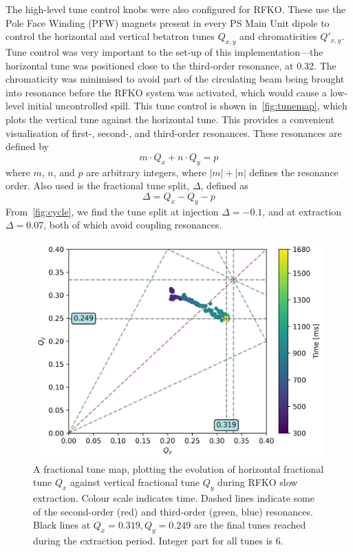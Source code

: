 \documentclass[a4paper,twoside,11pt]{report}
\begin{document}
The high-level tune control knobs were also configured for RFKO. These use the Pole Face Winding (PFW) magnets present in every PS Main Unit dipole to control the horizontal and vertical betatron tunes $Q_{x, y}$ and chromaticities $Q'_{x, y}$. Tune control was very important to the set-up of this implementation---the horizontal tune was positioned close to the third-order resonance, at 0.32. The chromaticity was minimised to avoid part of the circulating beam being brought into resonance before the RFKO system was activated, which would cause a low-level initial uncontrolled spill. This tune control is shown in~\autoref{fig:tunemap}, which plots the vertical tune against the horizontal tune. This provides a convenient visualisation of first-, second-, and third-order resonances. These resonances are defined by
\begin{equation}
  m\cdot Q_x+n\cdot Q_y=p
\end{equation} where $m$, $n$, and $p$ are arbitrary integers, where $|m|+|n|$ defines the resonance order. Also used is the fractional tune split, $\Delta$, defined as
\begin{equation}
  \Delta = Q_x-Q_y-p
\end{equation}
From~\autoref{fig:cycle}, we find the tune split at injection $\Delta=-0.1$, and at extraction $\Delta=0.07$, both of which avoid coupling resonances.

\begin{figure}
  \centering
  \includegraphics[width=0.6\linewidth]{tunemap.png}
  \caption[Fractional tune map during RFKO slow extraction]{A fractional tune map, plotting the evolution of horizontal fractional tune $Q_x$ against vertical fractional tune $Q_y$ during RFKO slow extraction. Colour scale indicates time. Dashed lines indicate some of the second-order (red) and third-order (green, blue) resonances. Black lines at $Q_x=0.319, Q_y=0.249$ are the final tunes reached during the extraction period. Integer part for all tunes is 6.}\label{fig:tunemap}
\end{figure}
\end{document}
